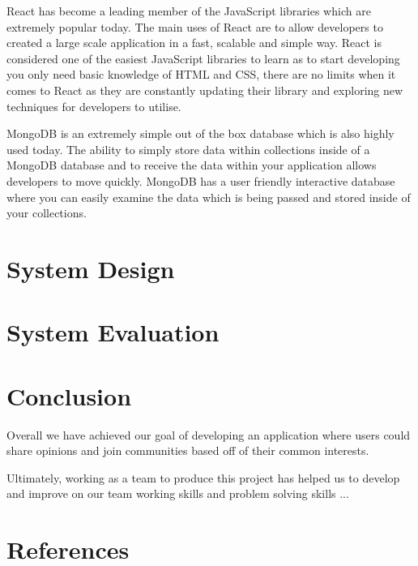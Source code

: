 \newline

React has become a leading member of the JavaScript libraries which are extremely popular today. The main uses of React are to allow developers to created a large scale application in a fast, scalable and simple way. React is considered one of the easiest JavaScript libraries to learn as to start developing you only need basic knowledge of HTML and CSS, there are no limits when it comes to React as they are constantly updating their library and exploring new techniques for developers to utilise. 

\newline

MongoDB is an extremely simple out of the box database which is also highly used today. The ability to simply store data within collections inside of a MongoDB database and to receive the data within your application allows developers to move quickly. MongoDB has a user friendly interactive database where you can easily examine the data which is being passed and stored inside of your collections.

\chapter{System Design}

\chapter{System Evaluation}


\chapter{Conclusion}
Overall we have achieved our goal of developing an application where users could share opinions and join communities based off of their common interests.

Ultimately, working as a team to produce this project has helped us to develop and improve on our team working skills and problem solving skills ...

\chapter{References}


